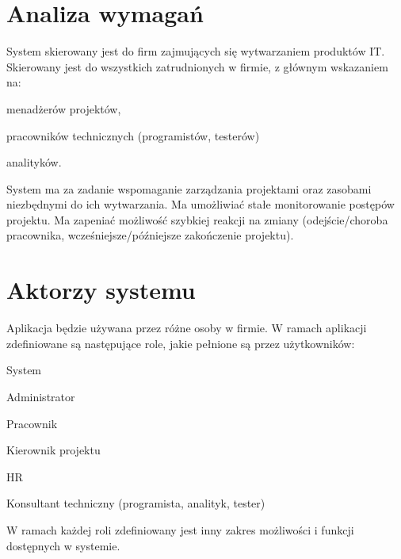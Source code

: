 \section{Analiza wymagań}
System skierowany jest do firm zajmujących się wytwarzaniem produktów IT. Skierowany jest do wszystkich zatrudnionych w firmie, z głównym wskazaniem na:
\begin{itemize*}
\item menadżerów projektów,
\item pracowników technicznych (programistów, testerów)
\item analityków.
\end{itemize*}

System ma za zadanie wspomaganie zarządzania projektami oraz zasobami niezbędnymi do ich wytwarzania. Ma umożliwiać stałe monitorowanie postępów projektu. Ma zapeniać możliwość szybkiej reakcji na zmiany (odejście/choroba pracownika, wcześniejsze/późniejsze zakończenie projektu).





\section{Aktorzy systemu}
Aplikacja będzie używana przez różne osoby w firmie. W ramach aplikacji zdefiniowane są następujące role, jakie pełnione są przez użytkowników:
\begin{itemize*}
\item System
\item Administrator
\item Pracownik
\item Kierownik projektu
\item HR
\item Konsultant techniczny (programista, analityk, tester)
\end{itemize*}
W ramach każdej roli zdefiniowany jest inny zakres możliwości i funkcji dostępnych w systemie.

